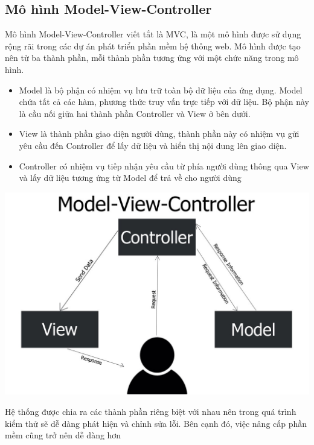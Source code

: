 \subsection{Mô hình Model-View-Controller}
Mô hình Model-View-Controller viết tắt là MVC, là một mô hình được sử dụng rộng rãi trong các dự án phát triển phần mềm hệ thống web. Mô hình được tạo nên từ ba thành phần, mỗi thành phần tương ứng với một chức năng trong mô hình.
\begin{itemize}
    \item Model là bộ phận có nhiệm vụ lưu trữ toàn bộ dữ liệu của ứng dụng. Model chứa tất cả các hàm, phương thức truy vấn trực tiếp với dữ liệu. Bộ phận này là cầu nối giữa hai thành phần Controller và View ở bên dưới. 
    \item View là thành phần giao diện người dùng, thành phần này có nhiệm vụ gửi yêu cầu đến Controller để lấy dữ liệu và hiển thị nội dung lên giao diện.
    \item Controller có nhiệm vụ tiếp nhận yêu cầu từ phía người dùng thông qua View và lấy dữ liệu tương ứng từ Model để trả về cho người dùng
\end{itemize}
\begin{center}
  \captionsetup{type=figure}
  \includegraphics[scale=0.2]{img/mvc.jpg}
\end{center}
\indent Hệ thống được chia ra các thành phần riêng biệt với nhau nên trong quá trình kiểm thử sẽ dễ dàng phát hiện và chỉnh sửa lỗi. Bên cạnh đó, việc nâng cấp phần mềm cũng trở nên dễ dàng hơn
